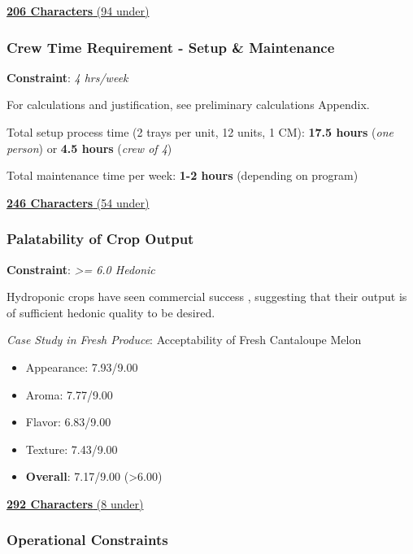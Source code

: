 \documentclass{report}
\begin{document}
\uline{\textbf{206 Characters} (94 under)}

\vspace{0.5cm}

\subsubsection{Crew Time Requirement - Setup \& Maintenance}
\label{sec:constraints-crewtime} 

\textbf{Constraint}: \textit{4 hrs/week}

For calculations and justification, see preliminary calculations Appendix.

Total setup process time (2 trays per unit, 12 units, 1 CM): \textbf{17.5 hours} (\textit{one person}) or \textbf{4.5 hours} (\textit{crew of 4})

Total maintenance time per week: \textbf{1-2 hours} (depending on program)

\uline{\textbf{246 Characters} (54 under)}

\newpage

\subsubsection{Palatability of Crop Output} 
\label{sec:constraints-palatability}

\textbf{Constraint}: \textit{>= 6.0 Hedonic}

Hydroponic crops have seen commercial success \cite{commercialhydro}, suggesting that their output is of sufficient hedonic quality to be desired.

\textit{Case Study in Fresh Produce}: Acceptability of Fresh Cantaloupe Melon \cite{melon}

\begin{itemize}
    \item Appearance: 7.93/9.00
    \item Aroma: 7.77/9.00
    \item Flavor: 6.83/9.00
    \item Texture: 7.43/9.00
    \item \textbf{Overall}: 7.17/9.00 (>6.00)
\end{itemize}

\uline{\textbf{292 Characters} (8 under)}

\vspace{0.5cm}

\subsubsection{Operational Constraints} 
\label{sec:constraints-operational}
\end{document}
